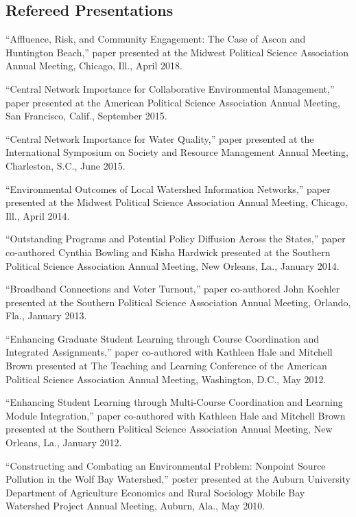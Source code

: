 \documentclass[11pt,letterpaper]{article}
\renewenvironment{itemize}{
  \begin{list}{}{
    \setlength{\leftmargin}{1.5em}
    \setlength{\itemsep}{0.25em}
    \setlength{\parskip}{0pt}
    \setlength{\parsep}{0.25em}
  }
}{
  \end{list}
}
\begin{document}
\subsection*{Refereed Presentations}
	\begin{itemize}\leftmargin=2pt\itemindent=-15pt
		\item ``Affluence, Risk, and Community Engagement: The Case of Ascon and Huntington Beach,'' paper presented at the Midwest Political Science Association Annual Meeting, Chicago, Ill., April 2018.
		
		\item ``Central Network Importance for Collaborative Environmental Management,'' paper presented at the American Political Science Association Annual Meeting, San Francisco, Calif., September 2015.
		
		\item ``Central Network Importance for Water Quality,'' paper presented at the International Symposium on Society and Resource Management Annual Meeting, Charleston, S.C., June 2015.
		
		\item ``Environmental Outcomes of Local Watershed Information Networks,'' paper presented at the Midwest Political Science Association Annual Meeting, Chicago, Ill., April 2014.
		
		\item ``Outstanding Programs and Potential Policy Diffusion Across the States,'' paper co-authored Cynthia Bowling and Kisha Hardwick presented at the Southern Political Science Association Annual Meeting, New Orleans, La., January 2014. 
		
		\item ``Broadband Connections and Voter Turnout,'' paper co-authored John Koehler presented at the Southern Political Science Association Annual Meeting, Orlando, Fla., January 2013.
		
		\item ``Enhancing Graduate Student Learning through Course Coordination and Integrated Assignments,'' paper co-authored with Kathleen Hale and Mitchell Brown presented at The Teaching and Learning Conference of the American Political Science Association Annual Meeting, Washington, D.C., May 2012.
		
		\item ``Enhancing Student Learning through Multi-Course Coordination and Learning Module Integration,'' paper co-authored with Kathleen Hale and Mitchell Brown presented at the Southern Political Science Association Annual Meeting, New Orleans, La., January 2012.
		
		\item ``Constructing and Combating an Environmental Problem: Nonpoint Source Pollution in the Wolf Bay Watershed,'' poster presented at the Auburn University Department of Agriculture Economics and Rural Sociology Mobile Bay Watershed Project Annual Meeting, Auburn, Ala., May 2010.
	\end{itemize}
	
\end{document}
